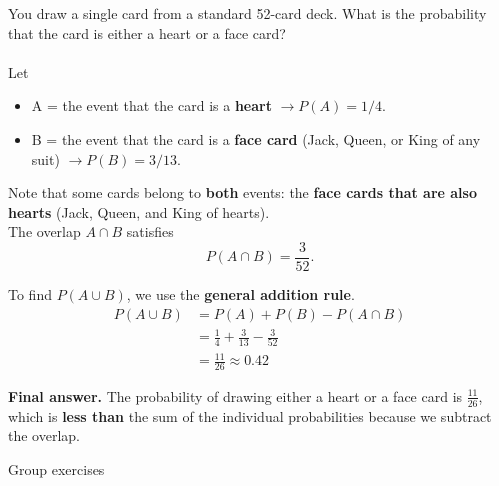 \documentclass[10pt]{beamer}
\begin{document}
\begin{frame}
\footnotesize 
\begin{mygreenbox}[title=\text{Example: Drawing a Card from a Deck}]
You draw a single card from a standard 52-card deck. What is the probability that the card is either a heart or a face card? \\
\\
\pause 
Let
\begin{itemize}
\item A = the event that the card is a \textbf{heart} $\rightarrow P(A) = 1/4$.\\
\item B = the event that the card is a \textbf{face card} (Jack, Queen, or King of any suit) $\rightarrow P(B) = 3/13$. 
\end{itemize}

\pause 
Note that some cards belong to \textbf{both} events: the \textbf{face cards that are also hearts} (Jack, Queen, and King of hearts). \\


The overlap $A \cap B$ satisfies
\[P(A \cap B)  = \frac{3}{52}.\]

\pause 
To find $P(A \cup B)$, we use the \textbf{general addition rule}.
%
\begin{align*}
P(A \cup B) &= P(A) + P(B) - P(A \cap B) \\
&= \frac{1}{4} + \frac{3}{13} - \frac{3}{52} \\
&= \frac{11}{26} \approx 0.42
\end{align*}
 	
\pause 
\textbf{Final answer.} The probability of drawing either a heart or a face card is $\frac{11}{26}$, which is \textbf{less than} the sum of the individual probabilities because we subtract the overlap.
\end{mygreenbox}

	
\end{frame}




\begin{frame}[standout]
Group exercises
\end{frame}
\end{document}
